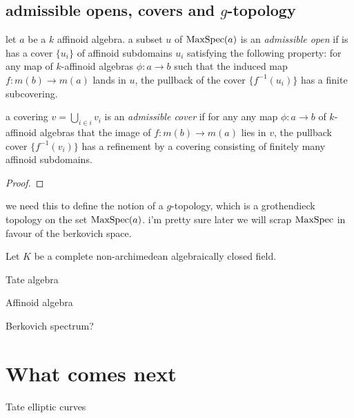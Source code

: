 \subsection{admissible opens, covers and $g$-topology} \label{sec:admissible_opens,_covers_and_g-topology}

\begin{definition}
	let $a$ be a  $k$ affinoid algebra. 
	a subset $u$ of $\operatorname{MaxSpec}(a)$ is an \emph{admissible open} if is has a cover $\{u_i\} $ of affinoid subdomains $u_i$ satisfying the following property: 
	for any map of $k$-affinoid algebras $\phi: a \to b$ such that the induced map $f: m(b) \to m(a)$ lands in $u$, the pullback of the cover $\{f^{-1}(u_i)\} $ has a finite subcovering. 


	a covering $v = \bigcup_{i \in  i} v_i$ is an \emph{admissible cover} if for any any map $\phi:a \to b$  of $k$-affinoid algebras that the image of  $f: m(b) \to m(a)$ lies in $v$, the pullback cover $\{f^{-1}(v_i)\} $ has a refinement by a covering consisting of finitely many affinoid subdomains.  
\end{definition}
\begin{proof}
\end{proof}

we need this to define the notion of a $g$-topology, which is a grothendieck topology on the set $\operatorname{MaxSpec}(a)$. 
i'm pretty sure later we will scrap $\operatorname{MaxSpec}$ in favour of the berkovich space.



Let $K$ be a complete non-archimedean algebraically closed field. 

\begin{definition}
	
\end{definition}

\begin{definition}
	Tate algebra 
\end{definition}
\begin{definition}
	Affinoid algebra 
\end{definition}

\begin{definition}
	Berkovich spectrum?
\end{definition}



\section{What comes next} \label{sec:what_comes_next}

Tate elliptic curves

